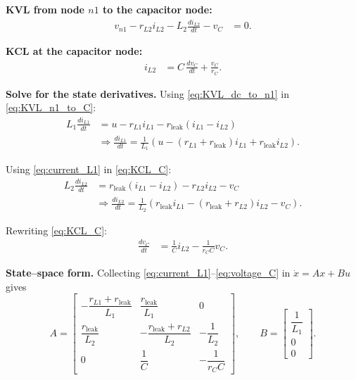 \textbf{KVL from node $n1$ to the capacitor node:}
\begin{align}
    v_{n1} - r_{L2} i_{L2} - L_2 \frac{di_{L2}}{dt} - v_C &= 0. \label{eq:KVL_n1_to_C}
\end{align}

\textbf{KCL at the capacitor node:}
\begin{align}
    i_{L2} &= C\,\frac{dv_C}{dt} + \frac{v_C}{r_C}. \label{eq:KCL_C}
\end{align}

\textbf{Solve for the state derivatives.}
Using \ref{eq:KVL_dc_to_n1} in \ref{eq:KVL_n1_to_C}:
\begin{align}
    L_1 \frac{di_{L1}}{dt} &= u - r_{L1}i_{L1} - r_{\text{leak}}(i_{L1} - i_{L2}) \nonumber \\
    &\Rightarrow \frac{di_{L1}}{dt} = \frac{1}{L_1} \left(u - (r_{L1} + r_{\text{leak}}) i_{L1} + r_{\text{leak}} i_{L2}\right). \label{eq:current_L1}
\end{align}

Using \ref{eq:current_L1} in \ref{eq:KCL_C}:
\begin{align}
    L_2 \frac{di_{L2}}{dt} &= r_{\text{leak}}(i_{L1} - i_{L2}) - r_{L2}i_{L2} - v_C \nonumber \\
    &\Rightarrow \frac{di_{L2}}{dt} = \frac{1}{L_2} \left(r_{\text{leak}} i_{L1} - (r_{\text{leak}} + r_{L2}) i_{L2} - v_C\right). \label{eq:current_L2}
\end{align}

Rewriting \ref{eq:KCL_C}:
\begin{align}
    \frac{dv_C}{dt} &= \frac{1}{C} i_{L2} - \frac{1}{r_C C} v_C. \label{eq:voltage_C}
\end{align}

\textbf{State–space form.}
Collecting \ref{eq:current_L1}–\ref{eq:voltage_C} in $\dot x = A x + B u$ gives
\[
\boxed{
A =
\begin{bmatrix}
-\dfrac{r_{L1}+r_{\text{leak}}}{L_1} & \dfrac{r_{\text{leak}}}{L_1} & 0\\[10pt]
\dfrac{r_{\text{leak}}}{L_2} & -\dfrac{r_{\text{leak}}+r_{L2}}{L_2} & -\dfrac{1}{L_2}\\[10pt]
0 & \dfrac{1}{C} & -\dfrac{1}{r_C C}
\end{bmatrix},
\qquad
B =
\begin{bmatrix}
\dfrac{1}{L_1}\\[6pt] 0\\[6pt] 0
\end{bmatrix}.
}
\]

